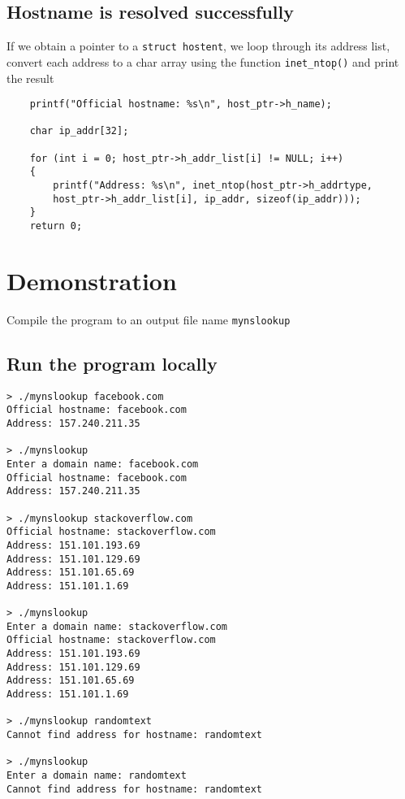 \documentclass[12pt]{article}
\begin{document}
\subsection{Hostname is resolved successfully}
If we obtain a pointer to a \Verb"struct hostent", we loop through its address list, convert each address to a char array using the function \Verb"inet_ntop̣()" and print the result 
\begin{verbatim}
    printf("Official hostname: %s\n", host_ptr->h_name);

    char ip_addr[32];

    for (int i = 0; host_ptr->h_addr_list[i] != NULL; i++)
    {
        printf("Address: %s\n", inet_ntop(host_ptr->h_addrtype, 
        host_ptr->h_addr_list[i], ip_addr, sizeof(ip_addr)));
    }
    return 0;
\end{verbatim}


\clearpage
\section{Demonstration}
Compile the program to an output file name \Verb"mynslookup"
\subsection{Run the program locally}
\begin{verbatim}
> ./mynslookup facebook.com
Official hostname: facebook.com
Address: 157.240.211.35

> ./mynslookup
Enter a domain name: facebook.com
Official hostname: facebook.com
Address: 157.240.211.35

> ./mynslookup stackoverflow.com
Official hostname: stackoverflow.com
Address: 151.101.193.69
Address: 151.101.129.69
Address: 151.101.65.69
Address: 151.101.1.69

> ./mynslookup
Enter a domain name: stackoverflow.com
Official hostname: stackoverflow.com
Address: 151.101.193.69
Address: 151.101.129.69
Address: 151.101.65.69
Address: 151.101.1.69

> ./mynslookup randomtext
Cannot find address for hostname: randomtext

> ./mynslookup
Enter a domain name: randomtext
Cannot find address for hostname: randomtext
\end{verbatim}
\end{document}
